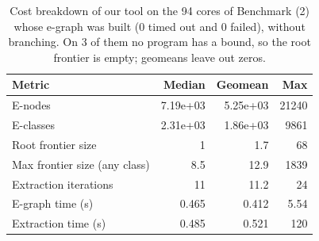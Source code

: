\begin{table}[H] \centering
\caption{Cost breakdown of our tool on the 94 cores of Benchmark (2) whose e-graph was built (0 timed out and 0 failed), without branching. On 3 of them no program has a bound, so the root frontier is empty; geomeans leave out zeros.}\label{tab:stats}
\begin{tabular}{lrrr}
\toprule
Metric & Median & Geomean & Max \\
\midrule
E-nodes & 7.19e+03 & 5.25e+03 & 21240 \\
E-classes & 2.31e+03 & 1.86e+03 & 9861 \\
Root frontier size & 1 & 1.7 & 68 \\
Max frontier size (any class) & 8.5 & 12.9 & 1839 \\
Extraction iterations & 11 & 11.2 & 24 \\
E-graph time (s) & 0.465 & 0.412 & 5.54 \\
Extraction time (s) & 0.485 & 0.521 & 120 \\
\bottomrule
\end{tabular}
\end{table}
